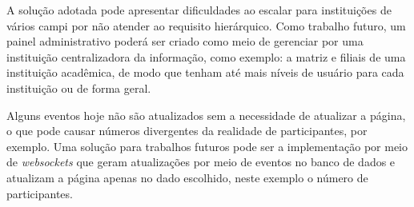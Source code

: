 A solução adotada pode apresentar dificuldades ao escalar para instituições de vários campi por não atender ao requisito hierárquico. Como trabalho futuro, um painel administrativo poderá ser criado como meio de gerenciar por uma instituição centralizadora da informação, como exemplo: a matriz e filiais de uma instituição acadêmica, de modo que tenham até mais níveis de usuário para cada instituição ou de forma geral.

Alguns eventos hoje não são atualizados sem a necessidade de atualizar a página, o que pode causar números divergentes da realidade de participantes, por exemplo. Uma solução para trabalhos futuros pode ser a implementação por meio de \textit{websockets} que geram atualizações por meio de eventos no banco de dados e atualizam a página apenas no dado escolhido, neste exemplo o número de participantes.